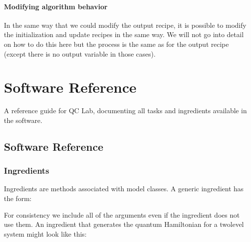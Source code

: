 \documentclass[letterpaper,10pt,english]{sphinxmanual}
\begin{document}
\subsubsection{Modifying algorithm behavior}
\label{\detokenize{user_guide/algorithm_dev:modifying-algorithm-behavior}}
\sphinxAtStartPar
In the same way that we could modify the output recipe, it is possible to modify the initialization and update recipes in the same way.
We will not go into detail on how to do this here but the process is the same as for the output recipe (except there is no output variable in those cases).


\chapter{Software Reference}
\label{\detokenize{index:software-reference}}
\sphinxAtStartPar
A reference guide for QC Lab, documenting all tasks and ingredients available in the software.

\sphinxstepscope


\section{Software Reference}
\label{\detokenize{software_reference/index:software-reference}}\label{\detokenize{software_reference/index:id1}}\label{\detokenize{software_reference/index::doc}}
\sphinxstepscope


\subsection{Ingredients}
\label{\detokenize{software_reference/ingredients/ingredients:ingredients}}\label{\detokenize{software_reference/ingredients/ingredients:id1}}\label{\detokenize{software_reference/ingredients/ingredients::doc}}
\sphinxAtStartPar
Ingredients are methods associated with model classes. A generic ingredient has the form:

\begin{sphinxVerbatim}[commandchars=\\\{\}]
    
      
     
\end{sphinxVerbatim}

\sphinxAtStartPar
For consistency we include all of the arguments even if the ingredient does not use them.
An ingredient that generates the quantum Hamiltonian for a two\sphinxhyphen{}level system might look like this:
\end{document}
